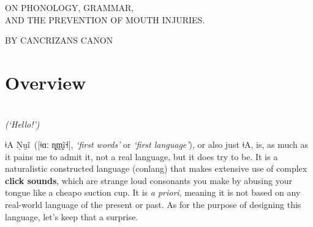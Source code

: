 \documentclass[11pt,a5paper]{book}
\newcommand{\qcn}[1]{\textcolor{AccentText}{\large#1}}
\newcommand{\langname}{\qcn{ǂA}}
\newcommand{\langnamelong}{\qcn{ǂA Ṇṵĩ}}
\begin{document}
\renewcommand{\arraystretch}{1.5}


\pagestyle{empty}




\begin{center}

	\Huge

	\vspace{0.4in}


	\vspace{0.2in}


	\vspace{1in}

	{\Large \textsc{ON PHONOLOGY, GRAMMAR,\\AND THE PREVENTION OF MOUTH INJURIES.}}

	\vfill

	{\Large \textsc{BY CANCRIZANS CANON}}

\end{center}


\pagebreak


\section{Overview}

\begin{center}
	\resizebox{1.5\width}{!}{\qcn{ǃUmǃoi!}}\\
\vspace{1em}
\emph{(`Hello!')}
\end{center}

\vspace{2em}

\langnamelong~([ǂɑː ɳ̰m̩̰ḭ̃˧], \emph{`first words'} or \emph{`first language'}), or also just \langname, is, as much as it pains me to admit it, not a real language, but it does try to be. It is a naturalistic constructed language (conlang) that makes extensive use of complex \textbf{click sounds}, which are strange loud consonants you make by abusing your tongue like a cheapo suction cup. It is \emph{a priori}, meaning it is not based on any real-world language of the present or past. As for the purpose of designing this language, let's keep that a surprise.
\end{document}
